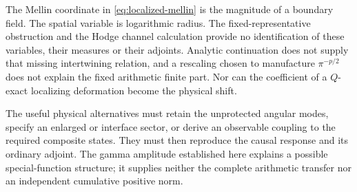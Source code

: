 The Mellin coordinate in \eqref{eq:localized-mellin} is the magnitude
of a boundary field. The spatial variable is logarithmic radius.
The fixed-representative obstruction and the Hodge channel calculation
provide no identification of these variables, their measures or
their adjoints. Analytic continuation does not supply that missing
intertwining relation, and a rescaling chosen to manufacture
$\pi^{-p/2}$ does not explain the fixed arithmetic finite part.
Nor can the coefficient of a $Q$-exact localizing deformation
become the physical shift.

The useful physical alternatives must retain the unprotected
angular modes, specify an enlarged or interface sector, or derive
an observable coupling to the required composite states. They
must then reproduce the causal response and its ordinary adjoint.
The gamma amplitude established here explains a possible special-function
structure; it supplies neither the complete arithmetic transfer nor
an independent cumulative positive norm.
